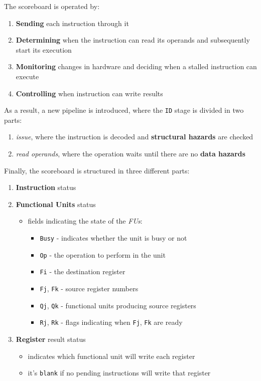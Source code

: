 \documentclass[english]{article}
\begin{document}
\bigskip
The scoreboard is operated by:

\begin{enumerate}
  \item \textbf{Sending} each instruction through it
  \item \textbf{Determining} when the instruction can read its operands and subsequently start its execution
  \item \textbf{Monitoring} changes in hardware and deciding when a stalled instruction can execute
  \item \textbf{Controlling} when instruction can write results
\end{enumerate}

As a result, a new pipeline is introduced, where the \texttt{ID} stage  is divided in two parts:
\begin{enumerate}
  \item \textit{issue}, where the instruction is decoded and \textbf{structural hazards} are checked
  \item \textit{read operands}, where the operation waits until there are no \textbf{data hazards}
\end{enumerate}

Finally, the scoreboard is structured in three different parts:
\begin{enumerate}
  \item \textbf{Instruction} status
  \item \textbf{Functional Units} status
        \begin{itemize}
          \item fields indicating the state of the \textit{FUs}:
                \begin{itemize}
                  \item \texttt{Busy} - indicates whether the unit is busy or not
                  \item \texttt{Op} - the operation to perform in the unit
                  \item \texttt{Fi} - the destination register
                  \item \texttt{Fj}, \texttt{Fk} - source register numbers
                  \item \texttt{Qj}, \texttt{Qk} - functional units producing source registers
                  \item \texttt{Rj}, \texttt{Rk} - flags indicating when \texttt{Fj}, \texttt{Fk} are ready
                \end{itemize}
        \end{itemize}
  \item \textbf{Register} result status
        \begin{itemize}
          \item indicates which functional unit will write each register
          \item it's \texttt{blank} if no pending instructions will write that register
        \end{itemize}
\end{enumerate}
\end{document}
